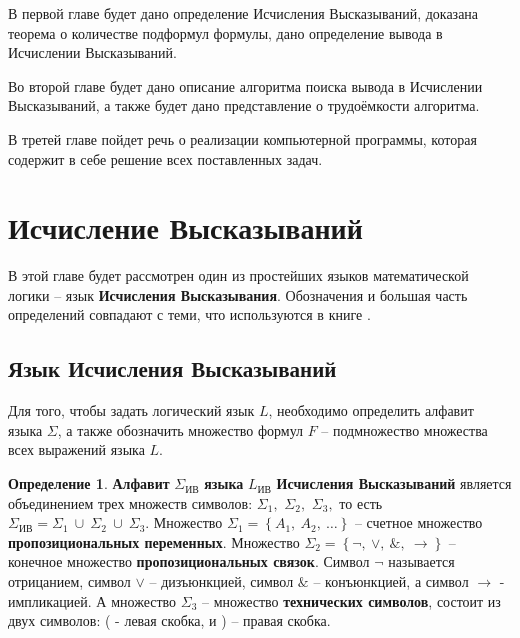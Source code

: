 \documentclass[a4paper,12pt]{article}
\theoremstyle{definition}
\newtheorem{definition}{Определение}
\begin{document}
	В первой главе будет дано определение Исчисления Высказываний, доказана теорема о количестве подформул формулы, дано определение вывода в Исчислении Высказываний.
	
	Во второй главе будет дано описание алгоритма поиска вывода в Исчислении Высказываний, а также будет дано представление о трудоёмкости алгоритма.	
	
	В третей главе пойдет речь о реализации компьютерной программы, которая содержит в себе решение всех поставленных задач.
	
	\section{Исчисление Высказываний}
	
	В этой главе будет рассмотрен один из простейших языков математической логики – язык \textbf{Исчисления Высказывания}. Обозначения и большая часть определений совпадают с теми, что используются в книге \cite{DurnevML}.
	
	\subsection{Язык Исчисления Высказываний}
	
	Для того, чтобы задать логический язык $ L $, необходимо определить алфавит языка $ \Sigma $, а также обозначить множество формул $ F $ – подмножество множества всех выражений языка $ L $.
	
	\begin{definition}
		\textbf{Алфавит} $ \Sigma_{\text{ИВ}} $ \textbf{языка} $ L_{\text{ИВ}} $ \textbf{Исчисления Высказываний} является объединением трех множеств символов: $\Sigma_{1},$ $\Sigma_{2},$ $\Sigma_{3}, $ то есть $ \Sigma_{\text{ИВ}} = \Sigma_{1}\:\cup\:\Sigma_{2}\:\cup\:\Sigma_{3}$.
		Множество $ \Sigma_{1}=\left\lbrace A_{1},\:A_{2},\:…\right\rbrace $ – счетное множество \textbf{пропозициональных переменных}.
		Множество $ \Sigma_{2} = \left\lbrace \lnot,\:\lor,\:\&,\:\to\right\rbrace  $ – конечное множество \textbf{пропозициональных связок}. Символ $ \lnot $ называется отрицанием, символ $ \lor $ – дизъюнкцией, символ $ \& $ – конъюнкцией, а символ $ \to $ - импликацией. А множество $ \Sigma_{3} $ – множество \textbf{технических символов}, состоит из двух символов: ( - левая скобка, и ) – правая скобка.
	\end{definition}
	
\end{document}
